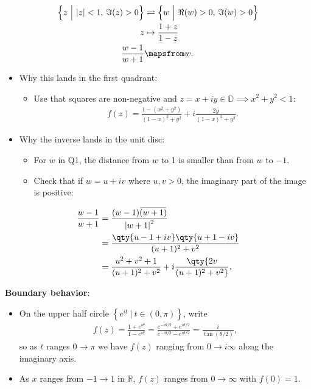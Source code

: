 \begin{proposition}

\begin{align*}
\left\{{ z {~\mathrel{\Big|}~}{\left\lvert {z} \right\rvert} < 1,\, \Im(z) > 0 }\right\} &\rightleftharpoons\left\{{ w {~\mathrel{\Big|}~}\Re(w)>0,\, \Im(w) > 0}\right\}  \\
z &\mapsto {1+z \over 1-z} \\
{w-1\over w+1} &\mapsfrom w
.\end{align*}

\begin{itemize}
\tightlist
\item
  Why this lands in the first quadrant:

  \begin{itemize}
  \tightlist
  \item
    Use that squares are non-negative and
    \(z=x+iy\in {\mathbb{D}}\implies x^2 + y^2 < 1\):
    \begin{align*}
    f(z)=\frac{1-\left(x^{2}+y^{2}\right)}{(1-x)^{2}+y^{2}}+i \frac{2 y}{(1-x)^{2}+y^{2}}
    .\end{align*}
  \end{itemize}
\item
  Why the inverse lands in the unit disc:

  \begin{itemize}
  \tightlist
  \item
    For \(w\) in Q1, the distance from \(w\) to 1 is smaller than from
    \(w\) to \(-1\).
  \item
    Check that if \(w=u+iv\) where \(u, v>0\), the imaginary part of the
    image is positive:
  \end{itemize}
\end{itemize}

\begin{align*}
{w-1 \over w+1} 
&= { (w-1) \mkern 1.5mu\overline{\mkern-1.5mu(w+1)\mkern-1.5mu}\mkern 1.5mu \over {\left\lvert {w+1} \right\rvert}^2}\\
&={ \qty{u-1 + iv} \qty{u+1-iv} \over (u+1)^2 + v^2 } \\
&= {u^2 + v^2 + 1 \over (u+1)^2 + v^2}
+ i\qty{ 2v \over (u+1)^2 + v^2}
.\end{align*}

\textbf{Boundary behavior}:

\begin{itemize}
\item
  On the upper half circle
  \(\left\{{ e^{it } {~\mathrel{\Big|}~}t\in (0, \pi) }\right\}\), write
  \begin{align*}
  f(z)=\frac{1+e^{i \theta}}{1-e^{i \theta}}=\frac{e^{-i \theta / 2}+e^{i \theta / 2}}{e^{-i \theta / 2}-e^{i \theta / 2}}=\frac{i}{\tan (\theta / 2)}
  ,\end{align*}
  so as \(t\) ranges \(0\to \pi\) we have \(f(z)\) ranging from
  \(0\to i\infty\) along the imaginary axis.
\item
  As \(x\) ranges from \(-1\to 1\) in \({\mathbb{R}}\), \(f(z)\) ranges
  from \(0\to \infty\) with \(f(0) = 1\).
\end{itemize}

\end{proposition}


